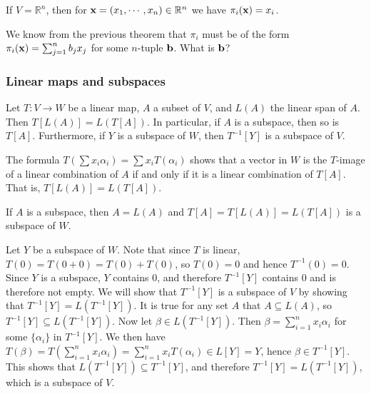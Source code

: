 \documentclass[12pt,letterpaper,reqno]{article}
\numberwithin{equation}{section}
\begin{document}
\begin{example}
If $V=\mathbb{R}^n$, then for ${\bf x}=(x_1,\cdots,x_n) \in \mathbb{R}^n$ we have $\pi_i({\bf x})=x_i$.	
\end{example}

\begin{exercise}
We know from the previous theorem that $\pi_i$ must be of the form $\pi_i({\bf x})=\sum_{j=1}^n b_j x_j$ for some $n$-tuple ${\bf b}$. What is ${\bf  b}$? 	
\end{exercise}

\subsubsection{Linear maps and subspaces}
\begin{thm}
	Let $T:V \to W$ be a linear map, $A$ a subset of $V$, and $L(A)$ the linear span of $A$. Then $T[L(A)]=L(T[A])$. In particular, if $A$ is a subspace, then so is $T[A]$. Furthermore, if $Y$ is a subspace of $W$, then $T^{-1}[Y]$ is a subspace of $V$.
\end{thm}

\begin{pf}
The formula $T(\sum x_i\alpha_i)=\sum x_i T(\alpha_i)$ shows that a vector in $W$ is the $T$-image of a linear combination of $A$ if and only if it is a linear combination of $T[A]$. That is, $T[L(A)]=L(T[A])$.

If $A$ is a subspace, then $A=L(A)$ and $T[A]=T[L(A)]=L(T[A])$ is a subspace of $W$.

Let $Y$ be a subspace of $W$. Note that since $T$ is linear, $T(0)=T(0+0)=T(0)+T(0)$, so $T(0)=0$ and hence $T^{-1}(0)=0$. Since $Y$ is a subspace, $Y$ contains $0$, and therefore $T^{-1}[Y]$ contains $0$ and is therefore not empty. We will show that $T^{-1}[Y]$ is a subspace of $V$ by showing that $T^{-1}[Y]=L(T^{-1}[Y])$. It is true for any set $A$ that $A \subseteq L(A)$, so $T^{-1}[Y]\subseteq L(T^{-1}[Y])$. Now let $\beta \in L(T^{-1}[Y])$. Then $\beta=\sum_{i=1}^nx_i\alpha_i$ for some $\{\alpha_i\}$ in $T^{-1}[Y]$. We then have $T(\beta)=T(\sum_{i=1}^nx_i\alpha_i)=\sum_{i=1}^nx_iT(\alpha_i) \in L[Y]=Y$, hence $\beta \in T^{-1}[Y]$. This shows that $L(T^{-1}[Y]) \subseteq T^{-1}[Y]$, and therefore $T^{-1}[Y]=L(T^{-1}[Y])$, which is a subspace of $V$.	
\end{pf}
\end{document}
